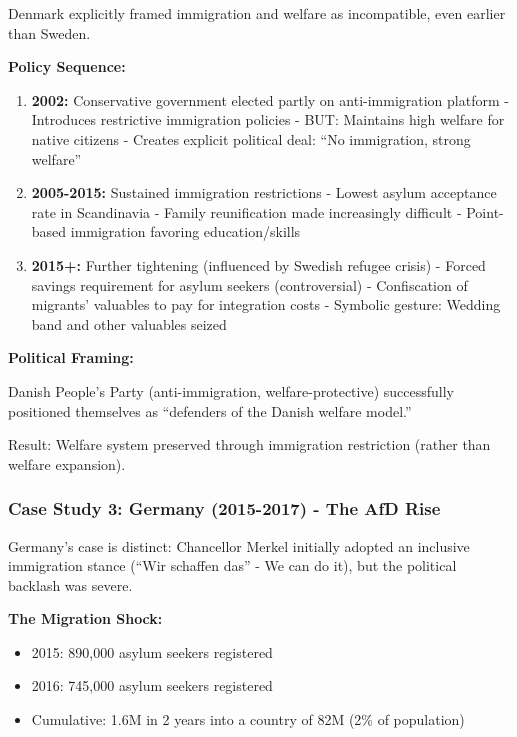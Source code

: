 Denmark explicitly framed immigration and welfare as incompatible, even earlier than Sweden.

\textbf{Policy Sequence:}

\begin{enumerate}

\item \textbf{2002:} Conservative government elected partly on anti-immigration platform
   - Introduces restrictive immigration policies
   - BUT: Maintains high welfare for native citizens
   - Creates explicit political deal: ``No immigration, strong welfare''

\item \textbf{2005-2015:} Sustained immigration restrictions
   - Lowest asylum acceptance rate in Scandinavia
   - Family reunification made increasingly difficult
   - Point-based immigration favoring education/skills

\item \textbf{2015+:} Further tightening (influenced by Swedish refugee crisis)
   - Forced savings requirement for asylum seekers (controversial)
   - Confiscation of migrants' valuables to pay for integration costs
   - Symbolic gesture: Wedding band and other valuables seized

\end{enumerate}

\textbf{Political Framing:}

Danish People's Party (anti-immigration, welfare-protective) successfully positioned themselves as ``defenders of the Danish welfare model.''

Result: Welfare system preserved through immigration restriction (rather than welfare expansion).

\subsubsection{Case Study 3: Germany (2015-2017) - The AfD Rise}

Germany's case is distinct: Chancellor Merkel initially adopted an inclusive immigration stance (``Wir schaffen das'' - We can do it), but the political backlash was severe.

\textbf{The Migration Shock:}

\begin{itemize}[nosep]
\item 2015: 890,000 asylum seekers registered
\item 2016: 745,000 asylum seekers registered
\item Cumulative: 1.6M in 2 years into a country of 82M (2\% of population)
\end{itemize}

